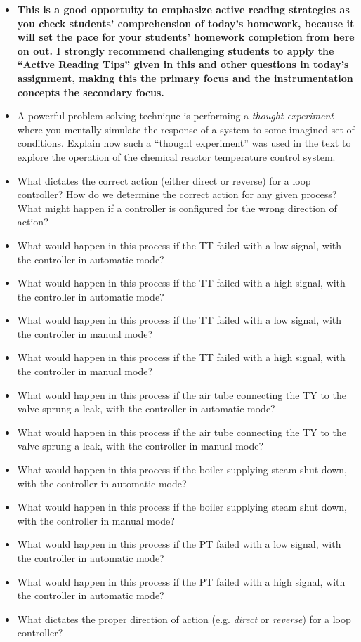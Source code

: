 \begin{itemize}
\item{} {\bf This is a good opportuity to emphasize active reading strategies as you check students' comprehension of today's homework, because it will set the pace for your students' homework completion from here on out.  I strongly recommend challenging students to apply the ``Active Reading Tips'' given in this and other questions in today's assignment, making this the primary focus and the instrumentation concepts the secondary focus.}
\item{} A powerful problem-solving technique is performing a {\it thought experiment} where you mentally simulate the response of a system to some imagined set of conditions.  Explain how such a ``thought experiment'' was used in the text to explore the operation of the chemical reactor temperature control system.
\item{} What dictates the correct action (either direct or reverse) for a loop controller?  How do we determine the correct action for any given process?  What might happen if a controller is configured for the wrong direction of action?
\item{} What would happen in this process if the TT failed with a low signal, with the controller in automatic mode?
\item{} What would happen in this process if the TT failed with a high signal, with the controller in automatic mode?
\item{} What would happen in this process if the TT failed with a low signal, with the controller in manual mode?
\item{} What would happen in this process if the TT failed with a high signal, with the controller in manual mode?
\item{} What would happen in this process if the air tube connecting the TY to the valve sprung a leak, with the controller in automatic mode?
\item{} What would happen in this process if the air tube connecting the TY to the valve sprung a leak, with the controller in manual mode?
\item{} What would happen in this process if the boiler supplying steam shut down, with the controller in automatic mode?
\item{} What would happen in this process if the boiler supplying steam shut down, with the controller in manual mode?
\item{} What would happen in this process if the PT failed with a low signal, with the controller in automatic mode?
\item{} What would happen in this process if the PT failed with a high signal, with the controller in automatic mode?
\item{} What dictates the proper direction of action (e.g. {\it direct} or {\it reverse}) for a loop controller?
\end{itemize}





